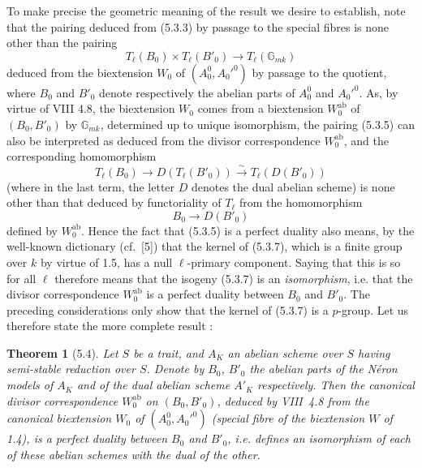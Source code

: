 \documentclass[11pt]{article}
\theoremstyle{plain}
\newtheorem{theoreme}[theorem]{Theorem}
\theoremstyle{definition}
\theoremstyle{remark}
\newcommand{\GG}{\mathbb G}
\newcommand{\Tl}{T_\ell}
\newcommand{\ab}{\mathrm{ab}}
\begin{document}
To make precise the geometric meaning of the result we desire to
establish, note that the pairing deduced from (5.3.3) by passage to the
special fibres is none other than the pairing
\begin{equation}
\Tl(B_0) \times \Tl(B'_0) \longrightarrow \Tl(\GG_{mk})
\end{equation}
deduced from the biextension $W_0$ of $(A_0^0, A_0'^0)$ by passage to
the quotient, where $B_0$ and $B'_0$ denote respectively the abelian
parts of $A_0^0$ and $A_0'^0$. As, by virtue of VIII 4.8, the
biextension $W_0$ comes from a biextension $W_0^{\ab}$ of $(B_0, B'_0)$
by $\GG_{mk}$, determined up to unique isomorphism, the pairing (5.3.5)
can also be interpreted as deduced from the divisor correspondence
$W_0^{\ab}$, and the corresponding homomorphism
\begin{equation}
\Tl(B_0) \longrightarrow D(\Tl(B'_0)) \overset{\sim}{\longrightarrow}
\Tl(D(B'_0))
\end{equation}
(where in the last term, the letter $D$ denotes the dual abelian scheme)
is none other than that deduced by functoriality of $\Tl$ from the
homomorphism
\begin{equation}
B_0 \longrightarrow D(B'_0)
\end{equation}
defined by $W_0^{\ab}$. Hence the fact that (5.3.5) is a perfect duality
also means, by the well-known dictionary (cf.~[5]) that the kernel of
(5.3.7), which is a finite group over $k$ by virtue of 1.5, has a null
$\ell$-primary component. Saying that this is so for all $\ell$ therefore
means that the isogeny (5.3.7) is an \emph{isomorphism}, i.e. that the
divisor correspondence $W_0^{\ab}$ is a perfect duality between $B_0$ and
$B'_0$. The preceding considerations only show that the kernel of (5.3.7)
is a $p$-group. Let us therefore state the more complete result :

\begin{theoreme}[5.4]
Let $S$ be a trait, and $A_K$ an abelian scheme over $S$ having
semi-stable reduction over $S$. Denote by $B_0$, $B'_0$ the abelian
parts of the N\'eron models of $A_K$ and of the dual abelian scheme
$A'_K$ respectively. Then the canonical divisor correspondence
$W_0^{\ab}$ on $(B_0, B'_0)$, deduced by VIII~4.8 from the canonical
biextension $W_0$ of $(A_0^0, A_0'^0)$ (special fibre of the biextension
$W$ of 1.4), is a perfect duality between $B_0$ and $B'_0$, i.e. defines
an isomorphism of each of these abelian schemes with the dual of the
other.
\end{theoreme}
\end{document}

